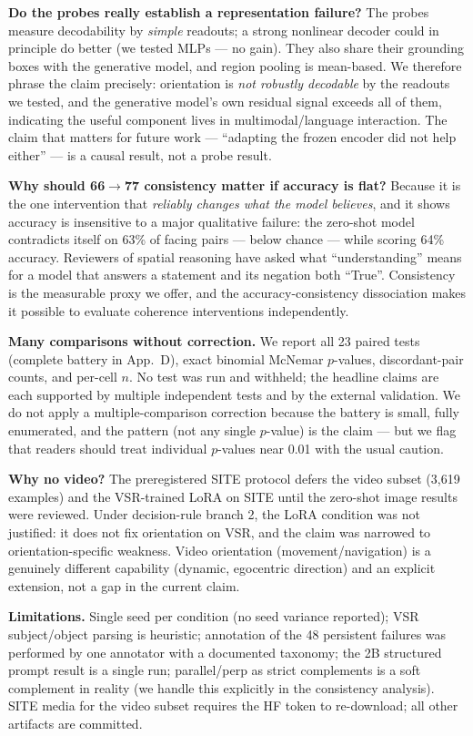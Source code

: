 \textbf{Do the probes really establish a representation failure?} The probes
measure decodability by \emph{simple} readouts; a strong nonlinear decoder could
in principle do better (we tested MLPs --- no gain). They also share their
grounding boxes with the generative model, and region pooling is mean-based. We
therefore phrase the claim precisely: orientation is \emph{not robustly
decodable} by the readouts we tested, and the generative model's own residual
signal exceeds all of them, indicating the useful component lives in
multimodal/language interaction. The claim that matters for future work ---
``adapting the frozen encoder did not help either'' --- is a causal result, not a
probe result.

\textbf{Why should 66$\rightarrow$77 consistency matter if accuracy is flat?}
Because it is the one intervention that \emph{reliably changes what the model
believes}, and it shows accuracy is insensitive to a major qualitative failure:
the zero-shot model contradicts itself on 63\% of facing pairs --- below chance
--- while scoring 64\% accuracy. Reviewers of spatial reasoning have asked what
``understanding'' means for a model that answers a statement and its negation
both ``True''. Consistency is the measurable proxy we offer, and the
accuracy-consistency dissociation makes it possible to evaluate coherence
interventions independently.

\textbf{Many comparisons without correction.} We report all 23 paired tests
(complete battery in App.~D), exact binomial McNemar $p$-values,
discordant-pair counts, and per-cell $n$. No test was run and withheld; the
headline claims are each supported by multiple independent tests and by the
external validation. We do not apply a multiple-comparison correction because
the battery is small, fully enumerated, and the pattern (not any single
$p$-value) is the claim --- but we flag that readers should treat individual
$p$-values near 0.01 with the usual caution.

\textbf{Why no video?} The preregistered SITE protocol defers the video subset
(3{,}619 examples) and the VSR-trained LoRA on SITE until the zero-shot image
results were reviewed. Under decision-rule branch 2, the LoRA condition was not
justified: it does not fix orientation on VSR, and the claim was narrowed to
orientation-specific weakness. Video orientation (movement/navigation) is a
genuinely different capability (dynamic, egocentric direction) and an explicit
extension, not a gap in the current claim.

\textbf{Limitations.} Single seed per condition (no seed variance reported);
VSR subject/object parsing is heuristic; annotation of the 48 persistent failures
was performed by one annotator with a documented taxonomy; the 2B structured
prompt result is a single run; parallel/perp as strict complements is a soft
complement in reality (we handle this explicitly in the consistency analysis).
SITE media for the video subset requires the HF token to re-download; all other
artifacts are committed.

